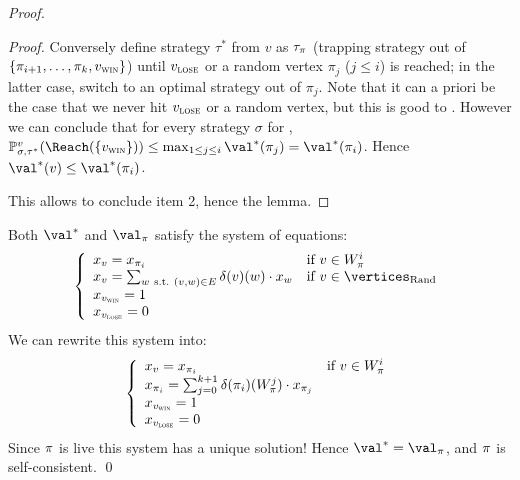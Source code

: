 \begin{proof}
\begin{proof}
    Conversely define strategy $\tau^*$ from $v$ as $\tau_\pi$
    (trapping strategy out of $\{\pi_{i+1},\ldots,\pi_k,v_{\textsc{win}}\}$)
    until $v_{\textsc{lose}}$ or a random vertex $\pi_j$ ($j \le i$) is reached;
    in the latter case, switch to an optimal strategy out of
    $\pi_j$. Note that it can a priori be the case that we never hit
    $v_{\textsc{lose}}$ or a random vertex, but this is good to \Adam. However we
    can conclude that for every strategy $\sigma$ for \Eve,
    $\probm_{\sigma,\tau^*}^v(\Reach(\{\vwin\})) \le \max_{1 \le j \le
      i}\val^*(\perm_j) = \val^*(\perm_i)$. Hence
    $\val^*(v) \le \val^*(\perm_i)$.

    This allows to conclude item 2, hence the lemma.
  \end{proof}

  Both $\val^*$ and $\val_\perm$ satisfy the system of equations:
  \[
  \left\{\begin{array}{ll} 
      x_v = x_{\perm_i} & \text{if}\ v \in W_\perm^i \\ 
      x_v = \sum_{w\ \text{s.t.}\ (v,w) \in E} \delta(v)(w) \cdot x_w
      & \text{if}\ v \in \Randomvertices \\
      x_{\vwin} = 1 \\
      x_{\vlose} = 0
    \end{array}\right.
  \]
  We can rewrite this system into:
  \[
  \left\{\begin{array}{ll} 
      x_v = x_{\pi_i} & \text{if}\ v \in W_\pi^i \\ 
      x_{\pi_i} = \sum_{j=0}^{k+1} \delta(\pi_i)(W_\pi^j) \cdot x_{\pi_j}
      & \\
      x_{v_{\textsc{win}}} = 1 \\
      x_{v_{\textsc{lose}}} = 0
    \end{array}\right.
  \]
  Since $\pi$ is live this system has a unique solution!  Hence
  $\val^* = \val_\perm$, and $\pi$ is self-consistent. \qed
\end{proof}

